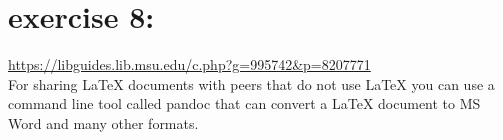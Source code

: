 \section{exercise 8:}
\url{https://libguides.lib.msu.edu/c.php?g=995742&p=8207771}
\\
For sharing LaTeX documents with peers that do not use LaTeX you can use a command line tool called pandoc that can convert a LaTeX document to MS Word and many other formats.
